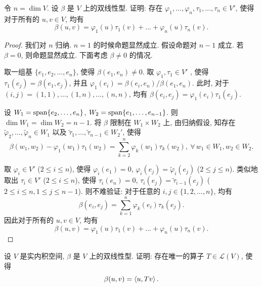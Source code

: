 \documentclass{article}
\begin{document}
\begin{problem}[9A-2]
  令 \( n=\dim V \). 设 \( \beta \) 是 \( V \) 上的双线性型. 证明: 存在 \( \varphi_1,\dots,\varphi_n,\tau_1,\dots,\tau_n \in V' \), 使得对于所有的 \( u,v\in V \), 均有
  \[ \beta(u,v) = \varphi_1(u)\tau_1(v)+\dots+\varphi_n(u)\tau_n(v). \]
\end{problem}

\begin{proof}
  我们对 \( n \) 归纳. \( n=1 \) 的时候命题显然成立. 假设命题对 \( n-1 \) 成立. 若 \( \beta=0 \), 则命题显然成立. 下面考虑 \( \beta\neq 0 \) 的情况.
  
  取一组基 \( \{e_1,e_2,\dots,e_n\} \), 使得 \( \beta(e_1,e_n)\neq 0 \). 取 \( \varphi_1,\tau_1\in V' \) , 使得 \( \tau_1(e_j) = \beta(e_1,e_j) \), 并且 \( \varphi_1(e_i) = \beta(e_i,e_n)/\beta(e_1,e_n) \). 此时, 对于 \( (i,j)=(1,1),\dots,(1,n),\dots,(n,n) \), 均有 \( \beta(e_i,e_j) = \varphi_1(e_i) \tau_1(e_j) \).

  设 \( W_1=\operatorname{span}\{e_2,\dots,e_n\} \), \( W_2=\operatorname{span}\{e_1,\dots,e_{n-1}\} \). 则 \( \dim W_1=\dim W_2=n-1 \). 将 \( \beta \) 限制在 \( W_1\times W_2 \) 上, 由归纳假设, 知存在 \( \tilde{\varphi}_2,\dots,\tilde{\varphi}_n\in W_1 \) 以及 \( \tilde{\tau}_1,\dots,\tilde{\tau}_{n-1}\in W_2' \), 使得
  \[ \beta(w_1,w_2)-\varphi_1(w_1)\tau_1(w_2)=\sum_{k=2}^{n}\varphi_k(w_1)\tau_k(w_2), \ \forall\, w_1\in W_1, w_2\in W_2. \]

  取 \( \varphi_i\in V' \) (\( 2\le i\le n \)), 使得 \( \varphi_i(e_1)=0 \), \( \varphi_i(e_j) = \tilde{\varphi}_i(e_j) \) (\( 2\le j\le n \)). 类似地取出 \( \tau_i \in V' \) (\( 2\le i\le n \)), 使得 \( \tau_i(e_n)=0 \), \( \tau_i(e_j) = \tilde{\tau}_{i-1}(e_j) \) (\( 2\le i\le n, 1\le j\le n-1 \)). 则不难验证: 对于任意的 \( i,j\in\{1,2,\dots,n\} \), 均有
  \[ \beta(e_i,e_j) = \sum_{k=1}^{n} \varphi_k(e_i) \tau_k(e_j). \]
  因此对于所有的 \( u,v\in V \), 均有
  \[ \beta(u,v) = \varphi_1(u)\tau_1(v)+\dots+\varphi_n(u)\tau_n(v). \]
\end{proof}



\begin{problem}[9A-4]
  设 \( V \) 是实内积空间, \( \beta \) 是 \( V \) 上的双线性型. 证明: 存在唯一的算子 \( T\in \mathcal{L}(V) \), 使得
  \[ \beta(u,v) = \left\langle u, Tv \right\rangle. \]
\end{problem}
\end{document}
